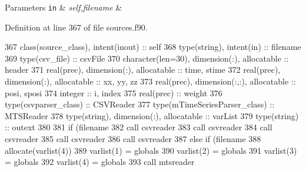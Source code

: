 \begin{DoxyParams}[1]{Parameters}
\mbox{\tt in}  & {\em self,filename} & \\
\hline
\end{DoxyParams}


Definition at line 367 of file sources.\+f90.


\begin{DoxyCode}
367     \textcolor{keywordtype}{class}(source\_class), \textcolor{keywordtype}{intent(inout)} :: self
368     \textcolor{keywordtype}{type}(string), \textcolor{keywordtype}{intent(in)} :: filename
369     \textcolor{keywordtype}{type}(csv\_file) :: csvFile
370     \textcolor{keywordtype}{character(len=30)}, \textcolor{keywordtype}{dimension(:)}, \textcolor{keywordtype}{allocatable} :: header
371     \textcolor{keywordtype}{real(prec)}, \textcolor{keywordtype}{dimension(:)}, \textcolor{keywordtype}{allocatable} :: time, stime
372     \textcolor{keywordtype}{real(prec)}, \textcolor{keywordtype}{dimension(:)}, \textcolor{keywordtype}{allocatable} :: xx, yy, zz
373     \textcolor{keywordtype}{real(prec)}, \textcolor{keywordtype}{dimension(:,:)}, \textcolor{keywordtype}{allocatable} :: posi, sposi
374     \textcolor{keywordtype}{integer} :: i, index
375     \textcolor{keywordtype}{real(prec)} :: weight
376     \textcolor{keywordtype}{type}(csvparser\_class) :: CSVReader
377     \textcolor{keywordtype}{type}(mTimeSeriesParser\_class) :: MTSReader
378     \textcolor{keywordtype}{type}(string), \textcolor{keywordtype}{dimension(:)}, \textcolor{keywordtype}{allocatable} :: varList
379     \textcolor{keywordtype}{type}(string) :: outext
380 
381     \textcolor{keywordflow}{if} (filename%
382         \textcolor{keyword}{call }csvreader%
383         \textcolor{keyword}{call }csvreader%
384         \textcolor{keyword}{call }csvreader%
385         \textcolor{keyword}{call }csvreader%
386         \textcolor{keyword}{call }csvreader%
387     \textcolor{keywordflow}{else} \textcolor{keywordflow}{if} (filename%
388         \textcolor{keyword}{allocate}(varlist(4))
389         varlist(1) = globals%
390         varlist(2) = globals%
391         varlist(3) = globals%
392         varlist(4) = globals%
393         \textcolor{keyword}{call }mtsreader%

\end{DoxyCode}
